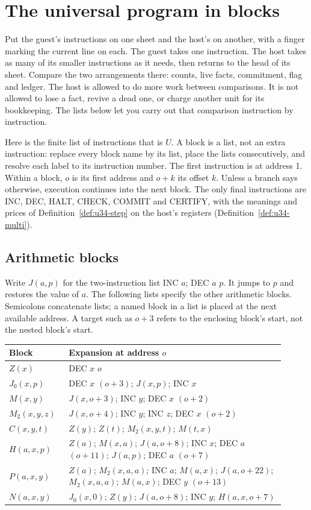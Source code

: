 \documentclass[11pt,twoside]{article}
\theoremstyle{thielethm}
\theoremstyle{thieledef}
\theoremstyle{thieledef}
\theoremstyle{thieledef}
\theoremstyle{thielethm}
\theoremstyle{thieleobs}
\theoremstyle{thielethm}
\begin{document}
\section{The universal program in blocks}

Put the guest's instructions on one sheet and the host's on another, with a finger
marking the current line on each. The guest takes one instruction. The host takes
as many of its smaller instructions as it needs, then returns to the head of its
sheet. Compare the two arrangements there: counts, live facts, commitment, flag
and ledger. The host is allowed to do more work between comparisons. It is not
allowed to lose a fact, revive a dead one, or charge another unit for its bookkeeping.
The lists below let you carry out that comparison instruction by instruction.

Here is the finite list of instructions that is $U$. A block is a list, not an extra
instruction: replace every block name by its list, place the lists consecutively, and
resolve each label to its instruction number. The first instruction is at address 1.
Within a block, $o$ is its first address and $o+k$ its offset $k$. Unless a branch says
otherwise, execution continues into the next block. The only final instructions are
INC, DEC, HALT, CHECK, COMMIT and CERTIFY, with the meanings and prices of
Definition~\ref{def:u34-step} on the host's registers (Definition~\ref{def:u34-multi}).

\subsection{Arithmetic blocks}

Write $J(a,p)$ for the two-instruction list INC $a$; DEC $a$ $p$.
It jumps to $p$ and restores the value of $a$.
The following lists specify the other arithmetic blocks. Semicolons concatenate lists;
a named block in a list is placed at the next available address. A target such as
$o+3$ refers to the enclosing block's start, not the nested block's start.

\begingroup\small
\begin{longtable}{@{}>{\raggedright\arraybackslash}p{0.19\linewidth}>{\raggedright\arraybackslash}p{0.72\linewidth}@{}}
\toprule
Block & Expansion at address $o$ \\
\midrule\endhead
$Z(x)$ & DEC $x$ $o$ \\
$J_0(x,p)$ & DEC $x$ $(o+3)$; $J(x,p)$; INC $x$ \\
$M(x,y)$ & $J(x,o+3)$; INC $y$; DEC $x$ $(o+2)$ \\
$M_2(x,y,z)$ & $J(x,o+4)$; INC $y$; INC $z$; DEC $x$ $(o+2)$ \\
$C(x,y,t)$ & $Z(y)$; $Z(t)$; $M_2(x,y,t)$; $M(t,x)$ \\
$H(a,x,p)$ & $Z(a)$; $M(x,a)$; $J(a,o+8)$; INC $x$; DEC $a$ $(o+11)$; $J(a,p)$; DEC $a$ $(o+7)$ \\
$P(a,x,y)$ & $Z(a)$; $M_2(x,a,a)$; INC $a$; $M(a,x)$; $J(a,o+22)$; $M_2(x,a,a)$; $M(a,x)$; DEC $y$ $(o+13)$ \\
$N(a,x,y)$ & $J_0(x,0)$; $Z(y)$; $J(a,o+8)$; INC $y$; $H(a,x,o+7)$ \\
\bottomrule
\end{longtable}
\endgroup
\end{document}
